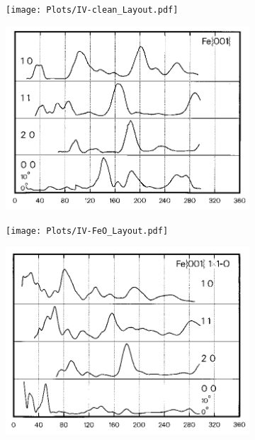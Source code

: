 \begin{figure}[H]
  \centering
  \begin{subfigure}{0.47\textwidth}
    \texttt{[image: Plots/IV-clean\_Layout.pdf]}
    \caption{}
  \end{subfigure}
  \begin{subfigure}{0.47\textwidth}
    \vspace{-0.2cm}
    \includegraphics[width=\textwidth]{Plots/fe.png}
    \caption{}
  \end{subfigure}
  \begin{subfigure}{0.47\textwidth}
    \texttt{[image: Plots/IV-FeO\_Layout.pdf]}
    \caption{}
  \end{subfigure}
  \begin{subfigure}{0.47\textwidth}
    \vspace{-0.2cm}
    \includegraphics[width=\textwidth]{Plots/feO.png}

\end{subfigure}
\end{figure}
